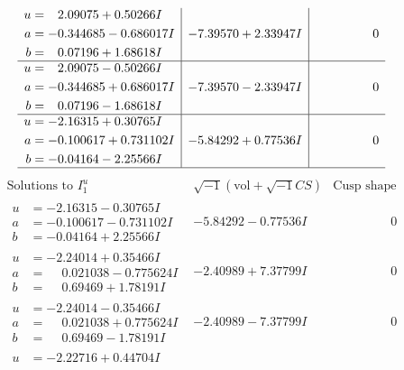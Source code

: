 \documentclass[1p]{elsarticle_modified}
\theoremstyle{definition}
\newcommand{\I}{\sqrt{-1}}
\begin{document}
$$\begin{array}{c|c|c}
\begin{aligned}
u &= \phantom{-}2.09075 + 0.50266 I \\
a &= -0.344685 - 0.686017 I \\
b &= \phantom{-}0.07196 + 1.68618 I\end{aligned}
 & -7.39570 + 2.33947 I & \phantom{-0.000000 } 0 \\ \hline\begin{aligned}
u &= \phantom{-}2.09075 - 0.50266 I \\
a &= -0.344685 + 0.686017 I \\
b &= \phantom{-}0.07196 - 1.68618 I\end{aligned}
 & -7.39570 - 2.33947 I & \phantom{-0.000000 } 0 \\ \hline\begin{aligned}
u &= -2.16315 + 0.30765 I \\
a &= -0.100617 + 0.731102 I \\
b &= -0.04164 - 2.25566 I\end{aligned}
 & -5.84292 + 0.77536 I & \phantom{-0.000000 } 0\\
 \hline 
 \end{array}$$\newpage$$\begin{array}{c|c|c}  
\text{Solutions to }I^u_{1}& \I (\text{vol} + \sqrt{-1}CS) & \text{Cusp shape}\\
 \hline 
\begin{aligned}
u &= -2.16315 - 0.30765 I \\
a &= -0.100617 - 0.731102 I \\
b &= -0.04164 + 2.25566 I\end{aligned}
 & -5.84292 - 0.77536 I & \phantom{-0.000000 } 0 \\ \hline\begin{aligned}
u &= -2.24014 + 0.35466 I \\
a &= \phantom{-}0.021038 - 0.775624 I \\
b &= \phantom{-}0.69469 + 1.78191 I\end{aligned}
 & -2.40989 + 7.37799 I & \phantom{-0.000000 } 0 \\ \hline\begin{aligned}
u &= -2.24014 - 0.35466 I \\
a &= \phantom{-}0.021038 + 0.775624 I \\
b &= \phantom{-}0.69469 - 1.78191 I\end{aligned}
 & -2.40989 - 7.37799 I & \phantom{-0.000000 } 0 \\ \hline\begin{aligned}
u &= -2.22716 + 0.44704 I \\

\end{aligned}
\end{array}$$
\end{document}
